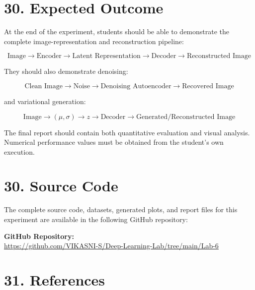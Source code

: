 \documentclass[10pt]{article}
\begin{document}
\section*{30. Expected Outcome}

At the end of the experiment, students should be able to demonstrate the
complete image-representation and reconstruction pipeline:

\[
\boxed{
\text{Image}
\rightarrow
\text{Encoder}
\rightarrow
\text{Latent Representation}
\rightarrow
\text{Decoder}
\rightarrow
\text{Reconstructed Image}
}
\]

They should also demonstrate denoising:

\[
\boxed{
\text{Clean Image}
\rightarrow
\text{Noise}
\rightarrow
\text{Denoising Autoencoder}
\rightarrow
\text{Recovered Image}
}
\]

and variational generation:

\[
\boxed{
\text{Image}
\rightarrow
(\mu,\sigma)
\rightarrow
z
\rightarrow
\text{Decoder}
\rightarrow
\text{Generated/Reconstructed Image}
}
\]

The final report should contain both quantitative evaluation and visual
analysis. Numerical performance values must be obtained from the student's
own execution.


\section*{30. Source Code}


The complete source code, datasets, generated plots, and report files for this experiment are available in the following GitHub repository:



\noindent\textbf{GitHub Repository:} \\
\url{https://github.com/VIKASNI-S/Deep-Learning-Lab/tree/main/Lab-6}\\

\section*{31. References}
\end{document}
